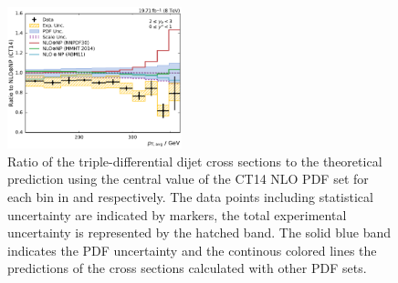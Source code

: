 \begin{figure}[h!tbp]
    \includegraphics[width=0.45\textwidth]{figures/measurement/ratio_to_CT14nlo+np_totcomp_yb2ys0.pdf}
    \caption[Ratio of the cross section to CT14 NLO]{
    Ratio of the triple-differential dijet cross sections to the theoretical
    prediction using the central value of the CT14 NLO PDF set for each bin in \ystar
    and \yboost respectively. The data points including statistical uncertainty are
    indicated by markers, the total experimental uncertainty is represented by the
    hatched band. The solid blue band indicates the PDF uncertainty and the
    continous colored lines the predictions of the cross sections calculated with
    other PDF sets.}
    \label{fig:ratio_ct14_nlo}
\end{figure}


